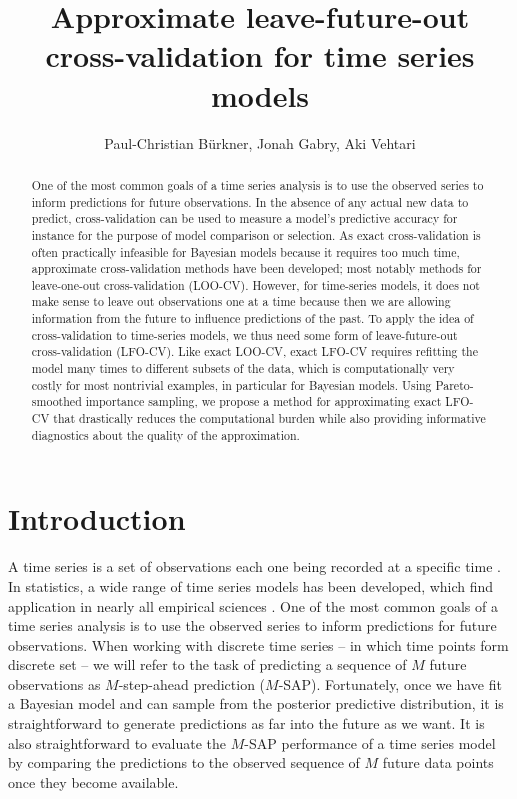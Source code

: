 \documentclass[american,]{article}
\title{Approximate leave-future-out cross-validation for time series models}
\author{Paul-Christian Bürkner, Jonah Gabry, Aki Vehtari}
\date{}
\begin{document}
\maketitle
\begin{abstract}
One of the most common goals of a time series analysis is to use the observed series to inform predictions for future observations. In the absence of any actual new data to predict, cross-validation can be used to measure a model's predictive accuracy for instance for the purpose of model comparison or selection. As exact cross-validation is often practically infeasible for Bayesian models because it requires too much time, approximate cross-validation methods have been developed; most notably methods for leave-one-out cross-validation (LOO-CV). However, for time-series models, it does not make sense to leave out observations one at a time because then we are allowing information from the future to influence predictions of the past. To apply the idea of cross-validation to time-series models, we thus need some form of leave-future-out cross-validation (LFO-CV). Like exact LOO-CV, exact LFO-CV requires refitting the model many times to different subsets of the data, which is computationally very costly for most nontrivial examples, in particular for Bayesian models. Using Pareto-smoothed importance sampling, we propose a method for approximating exact LFO-CV that drastically reduces the computational burden while also providing informative diagnostics about the quality of the approximation.
\end{abstract}

\hypertarget{introduction}{%
\section{Introduction}\label{introduction}}

A time series is a set of observations each one being recorded at a specific
time \citep{brockwell2002}. In statistics, a wide range of time series models has
been developed, which find application in nearly all empirical sciences \citep[e.g.,
see][]{brockwell2002, hamilton1994}. One of the most common goals of a time series
analysis is to use the observed series to inform predictions for future
observations. When working with discrete time series -- in which time points form
discrete set -- we will refer to the task of predicting a sequence of \(M\) future
observations as \(M\)-step-ahead prediction (\(M\)-SAP). Fortunately, once we have
fit a Bayesian model and can sample from the posterior predictive distribution,
it is straightforward to generate predictions as far into the future as we want.
It is also straightforward to evaluate the \(M\)-SAP performance of a time series
model by comparing the predictions to the observed sequence of \(M\) future data
points once they become available.
\end{document}
